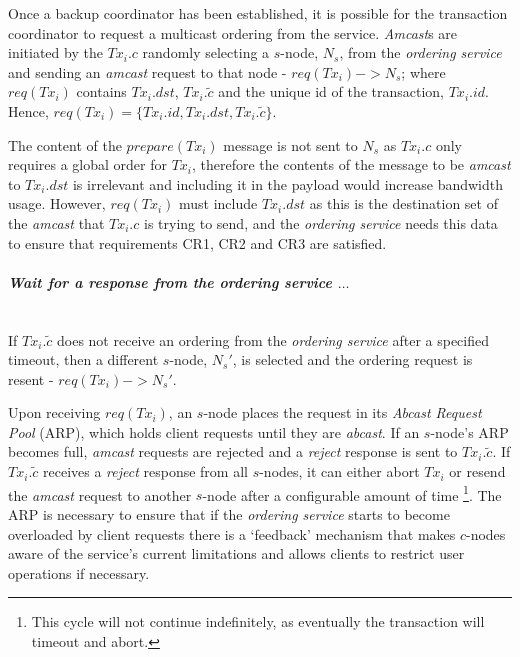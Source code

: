 \begin{enumerate}
        \leftbar        
        Once a backup coordinator has been established, it is possible for the transaction coordinator to request a multicast ordering from the service.  \emph{Amcast}s are initiated by the $Tx_i.c$ randomly selecting a $s$-node, $N_s$, from the \emph{ordering service} and sending an \emph{amcast} request to that node - $req(Tx_i) -> N_s$; where $req(Tx_i)$ contains $Tx_i.dst$, $Tx_i.\tilde{c}$ and the unique id of the transaction, $Tx_i.id$.  Hence, $req(Tx_i) = \{Tx_i.id, Tx_i.dst, Tx_i.\tilde{c}\}$.  
        
        The content of the $prepare(Tx_i)$ message is not sent to $N_s$ as $Tx_i.c$ only requires a global order for $Tx_i$, therefore the contents of the message to be \emph{amcast} to $Tx_i.dst$ is irrelevant and including it in the payload would increase bandwidth usage.  However, $req(Tx_i)$ must include $Tx_i.dst$ as this is the destination set of the \emph{amcast} that $Tx_i.c$ is trying to send, and the \emph{ordering service} needs this data to ensure that requirements CR1, CR2 and CR3 are satisfied.  
        \endleftbar
        
        \paragraph{\textit{Wait for a response from the ordering service $\ldots$}} \hfill \\
                If $Tx_i.\tilde{c}$ does not receive an ordering from the \emph{ordering service} after a specified timeout, then a different $s$-node, $N_s'$, is selected and the ordering request is resent - $req(Tx_i) -> N_s'$.
        
            Upon receiving $req(Tx_i)$, an $s$-node places the request in its \emph{Abcast Request Pool} (ARP), which holds client requests until they are \emph{abcast}.  If an $s$-node's ARP becomes full, \emph{amcast} requests are rejected and a \emph{reject} response is sent to $Tx_i.\tilde{c}$.  If $Tx_i.\tilde{c}$ receives a \emph{reject} response from all $s$-nodes, it can either abort $Tx_i$ or resend the \emph{amcast} request to another $s$-node after a configurable amount of time \footnote{This cycle will not continue indefinitely, as eventually the transaction will timeout and abort.}.  The ARP is necessary to ensure that if the \emph{ordering service} starts to become overloaded by client requests there is a \textquoteleft{}feedback' mechanism that makes $c$-nodes aware of the service's current limitations and allows clients to restrict user operations if necessary. 
            

\end{enumerate}
